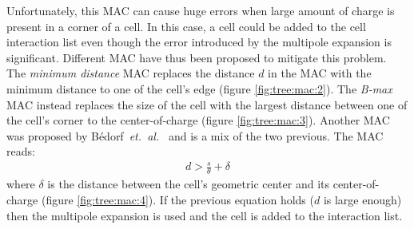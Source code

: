 Unfortunately, this MAC can cause huge errors when large amount of charge is
present in a corner of a cell\cite{Pfalzner1996}.
In this case, a cell could be added to the cell
interaction list even though the error introduced by the multipole expansion is
significant. Different MAC have thus been proposed to mitigate this problem.
The \textit{minimum distance} MAC replaces the distance $d$ in the MAC with the
minimum distance to one of the cell's edge (figure \ref{fig:tree:mac:2}).
The \textit{B-max} MAC instead
replaces the size of the cell with the largest distance between one of the
cell's corner to the center-of-charge (figure \ref{fig:tree:mac:3}).
Another MAC was proposed by
B\'edorf~\textit{et.~al.}~\cite{Bedorf2012} and is a mix of the two previous.
The MAC reads:
\begin{align}
d > \frac{s}{\theta} + \delta
\end{align}
where $\delta$ is the distance between the cell's geometric center and its
center-of-charge (figure \ref{fig:tree:mac:4}).
If the previous equation holds ($d$ is large enough) then the
multipole expansion is used and the cell is added to the interaction list.

